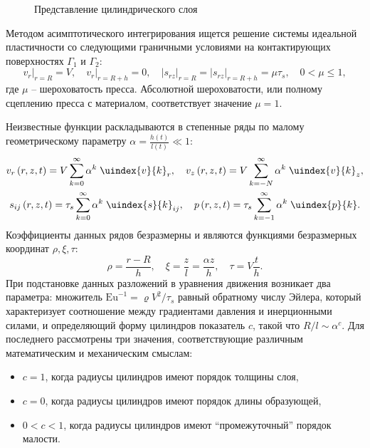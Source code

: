 \begin{figure}[ht]
  \caption{Представление цилиндрического слоя}
  \label{fig:ch2/layer}
\end{figure}

Методом асимптотического интегрирования ищется решение системы идеальной пластичности  со следующими граничными условиями на контактирующих поверхностях $\Gamma_{1}$ и $\Gamma_{2}$:
\begin{equation}
  v_{r}\lvert_{r=R} = V, \quad v_{r}\lvert_{r=R+h} = 0, \quad \lvert s_{rz}\lvert_{r=R} = \lvert s_{rz}\lvert_{r=R+h} = \mu \tau_{s}, \quad 0 < \mu \le 1,
\end{equation}
где $\mu$ -- шероховатость пресса. Абсолютной шероховатости, или полному сцеплению пресса с материалом, соответствует значение $\mu = 1$.

Неизвестные функции раскладываются в степенные ряды по малому геометрическому параметру $\alpha=\frac{h(t)}{l(t)}\ll1$:
\begin{gather}
  v_{r}\left(r, z, t\right) = V \sum_{k=0}^{\infty}{\alpha^{k} \; \uindex{v}{k}_{r}}, \quad v_{z}\left(r, z, t\right) = V \sum_{k=-N}^{\infty}{\alpha^{k} \; \uindex{v}{k}_{z}},
  \\
  s_{ij}\left(r, z, t\right) = \tau_{s} \sum_{k=0}^{\infty}{\alpha^{k} \; \uindex{s}{k}_{ij}}, \quad p\left(r, z, t \right) = \tau_{s} \sum_{k=-1}^{\infty}{\alpha^{k} \; \uindex{p}{k}}.
\end{gather}
Коэффициенты данных рядов безразмерны и являются функциями безразмерных координат $\rho, \xi, \tau$:
\begin{equation}
  \rho = \frac{r-R}{h}, \quad \xi = \frac{z}{l}=\frac{\alpha z}{h}, \quad \tau = V \frac{t}{h}.
\end{equation}
При подстановке данных разложений в уравнения движения возникает два параметра: множитель $\text{Eu}^{-1}=\varrho V^2/\tau_s$ равный обратному числу Эйлера, который характеризует соотношение между градиентами давления и инерционными силами, и определяющий форму цилиндров показатель $c$, такой что $R/l\sim\alpha^c$. Для последнего рассмотрены три значения, соответствующие различным математическим и механическим смыслам:
\begin{itemize}
  \item $c=1$, когда радиусы цилиндров имеют порядок толщины слоя,
  \item $c=0$, когда радиусы цилиндров имеют порядок длины образующей,
  \item $0<c<1$, когда радиусы цилиндров имеют ``промежуточный'' порядок малости.
\end{itemize}

